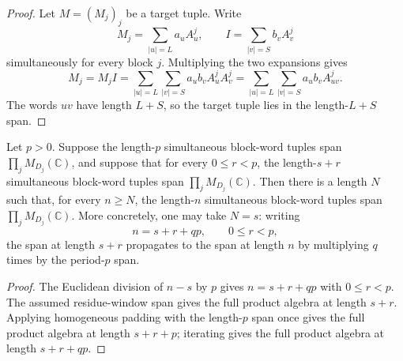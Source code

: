 \begin{proof}
    \leanok
    Let \(M=(M_j)_j\) be a target tuple.  Write
    \[
        M_j=\sum_{|u|=L} a_u A^j_u,
        \qquad
        I=\sum_{|v|=S} b_v A^j_v
    \]
    simultaneously for every block \(j\).  Multiplying the two expansions gives
    \[
        M_j
        =
        M_j I
        =
        \sum_{|u|=L}\sum_{|v|=S} a_u b_v A^j_uA^j_v
        =
        \sum_{|u|=L}\sum_{|v|=S} a_u b_v A^j_{uv}.
    \]
    The words \(uv\) have length \(L+S\), so the target tuple lies in the
    length-\(L+S\) span.
\end{proof}

\begin{lemma}
    \label{lem:period_window_word_tuple_span_padding}
    \leanok
    Let \(p>0\). Suppose the length-\(p\) simultaneous block-word tuples span
    \(\prod_j M_{D_j}(\mathbb C)\), and suppose that for every
    \(0\le r<p\), the length-\(s+r\) simultaneous block-word tuples span
    \(\prod_j M_{D_j}(\mathbb C)\). Then there is a length \(N\) such that,
    for every \(n\ge N\), the length-\(n\) simultaneous block-word tuples span
    \(\prod_j M_{D_j}(\mathbb C)\). More concretely, one may take \(N=s\):
    writing
    \[
        n=s+r+qp,\qquad 0\le r<p,
    \]
    the span at length \(s+r\) propagates to the span at length \(n\) by
    multiplying \(q\) times by the period-\(p\) span.
\end{lemma}

\begin{proof}
    \leanok
    The Euclidean division of \(n-s\) by \(p\) gives
    \(n=s+r+qp\) with \(0\le r<p\).  The assumed residue-window span gives the
    full product algebra at length \(s+r\). Applying homogeneous padding with
    the length-\(p\) span once gives the full product algebra at length
    \(s+r+p\); iterating gives the full product algebra at length \(s+r+qp\).
\end{proof}


